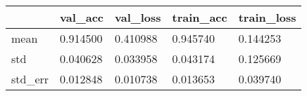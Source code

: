 \begin{tabular}{|l|l|l|l|l|}
\toprule \hline
 & val\_acc & val\_loss & train\_acc & train\_loss \\ \hline
\midrule
mean & 0.914500 & 0.410988 & 0.945740 & 0.144253 \\ \hline
std & 0.040628 & 0.033958 & 0.043174 & 0.125669 \\ \hline
std\_err & 0.012848 & 0.010738 & 0.013653 & 0.039740 \\ \hline
\bottomrule
\end{tabular}
